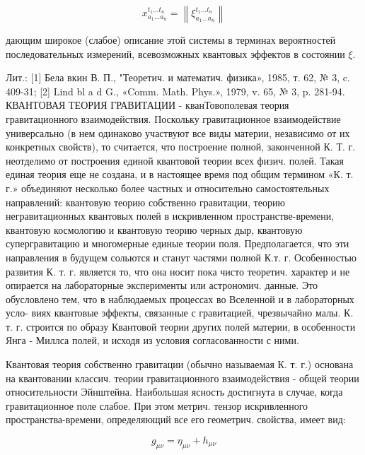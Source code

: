 \documentclass[10pt]{article}
\begin{document}
\[

x_{a_{1} \ldots a_{n}}^{t_{1} \ldots t_{n}}=\left\|\xi_{a_{1} \ldots a_{n}}^{t_{1} \ldots t_{n}}\right\|

\]



дающим широкое (слабое) описание этой системы в терминах вероятностей последовательных измерений, всевозможных квантовых эффектов в состоянии $\xi$.



Лит.: [1] Бела вкин В. П., "Теоретич. и математич. физика», 1985, т. 62, № 3, c. 409-31; [2] Lind bl a d G., «Comm. Math. Phys.», 1979, v. 65, № 3, p. 281-94. КВАНТОВАЯ ТЕОРИЯ ГРАВИТАЦИИ - кванТовополевая теория гравитационного взаимодействия. Поскольку гравитационное взаимодействие универсально (в нем одинаково участвуют все виды материи, независимо от их конкретных свойств), то считается, что построение полной, законченной К. Т. г. неотделимо от построения единой квантовой теории всех физич. полей. Такая единая теория еще не создана, и в настоящее время под общим термином «К. т. г.» объединяют несколько более частных и относительно самостоятельных направлений: квантовую теорию собственно гравитации, теорию негравитационных квантовых полей в искривленном пространстве-времени, квантовую космологию и квантовую теорию черных дыр, квантовую супергравитацию и многомерные единые теории поля. Предполагается, что эти направления в будущем сольются и станут частями полной К.т. г. Особенностью развития К. т. г. является то, что она носит пока чисто теоретич. характер и не опирается на лабораторные эксперименты или астрономич. данные. Это обусловлено тем, что в наблюдаемых процессах во Вселенной и в лабораторных усло- виях квантовые эффекты, связанные с гравитацией, чрезвычайно малы. К. т. г. строится по образу Квантовой теории других полей материи, в особенности Янга - Миллса полей, и исходя из условия согласованности с ними.



Квантовая теория собственно гравитации (обычно называемая К. т. г.) основана на квантовании классич. теории гравитационного взаимодействия - общей теории относительности Эйнштейна. Наибольшая ясность достигнута в случае, когда гравитационное поле слабое. При этом метрич. тензор искривленного пространства-времени, определяющий все его геометрич. свойства, имеет вид:



\[

g_{\mu \nu}=\eta_{\mu \nu}+h_{\mu \nu}

\]
\end{document}
